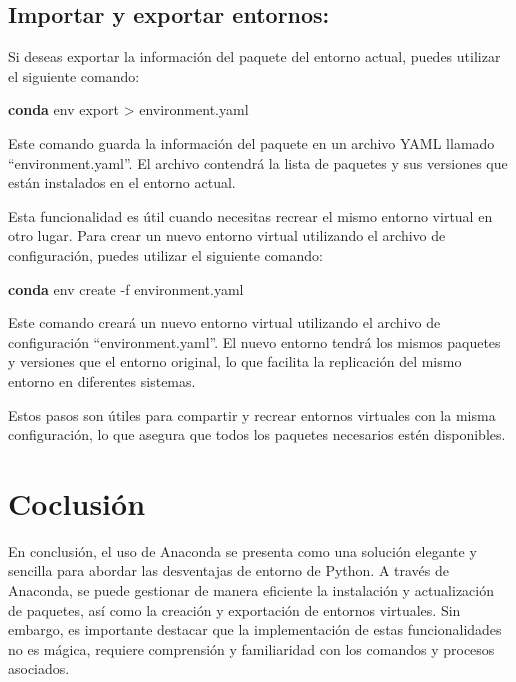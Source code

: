 \documentclass[
  letterpaper,
  DIV=11,
  numbers=noendperiod]{scrartcl}
\newenvironment{Shaded}{}{}
\newcommand{\AttributeTok}[1]{\textcolor[rgb]{0.84,0.23,0.29}{#1}}
\newcommand{\ExtensionTok}[1]{\textcolor[rgb]{0.84,0.23,0.29}{\textbf{#1}}}
\newcommand{\NormalTok}[1]{\textcolor[rgb]{0.14,0.16,0.18}{#1}}
\newcommand{\OperatorTok}[1]{\textcolor[rgb]{0.14,0.16,0.18}{#1}}
\begin{document}
\hypertarget{importar-y-exportar-entornos}{%
\subsection{Importar y exportar
entornos:}\label{importar-y-exportar-entornos}}

Si deseas exportar la información del paquete del entorno actual, puedes
utilizar el siguiente comando:

\begin{Shaded}
\begin{Highlighting}[]
\ExtensionTok{conda}\NormalTok{ env export }\OperatorTok{\textgreater{}}\NormalTok{ environment.yaml}
\end{Highlighting}
\end{Shaded}

Este comando guarda la información del paquete en un archivo YAML
llamado ``environment.yaml''. El archivo contendrá la lista de paquetes
y sus versiones que están instalados en el entorno actual.

Esta funcionalidad es útil cuando necesitas recrear el mismo entorno
virtual en otro lugar. Para crear un nuevo entorno virtual utilizando el
archivo de configuración, puedes utilizar el siguiente comando:

\begin{Shaded}
\begin{Highlighting}[]
\ExtensionTok{conda}\NormalTok{ env create }\AttributeTok{{-}f}\NormalTok{ environment.yaml}
\end{Highlighting}
\end{Shaded}

Este comando creará un nuevo entorno virtual utilizando el archivo de
configuración ``environment.yaml''. El nuevo entorno tendrá los mismos
paquetes y versiones que el entorno original, lo que facilita la
replicación del mismo entorno en diferentes sistemas.

Estos pasos son útiles para compartir y recrear entornos virtuales con
la misma configuración, lo que asegura que todos los paquetes necesarios
estén disponibles.

\hypertarget{coclusiuxf3n}{%
\section{Coclusión}\label{coclusiuxf3n}}

En conclusión, el uso de Anaconda se presenta como una solución elegante
y sencilla para abordar las desventajas de entorno de Python. A través
de Anaconda, se puede gestionar de manera eficiente la instalación y
actualización de paquetes, así como la creación y exportación de
entornos virtuales. Sin embargo, es importante destacar que la
implementación de estas funcionalidades no es mágica, requiere
comprensión y familiaridad con los comandos y procesos asociados.
\end{document}

